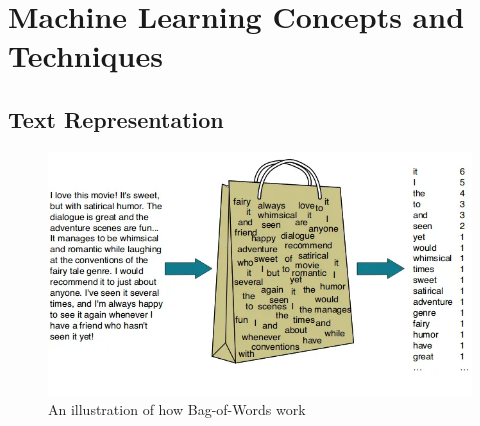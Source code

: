 


\section{Machine Learning Concepts and Techniques}

\subsection{Text Representation}

\begin{figure}[htbp]
    \centering
    \includegraphics[width=0.7\linewidth]{images/bow_illustration.png}
    \caption{An illustration of how Bag-of-Words work \cite{rahul-2023-bow-medium}}
    \label{fig:bow_illustration}
\end{figure}

